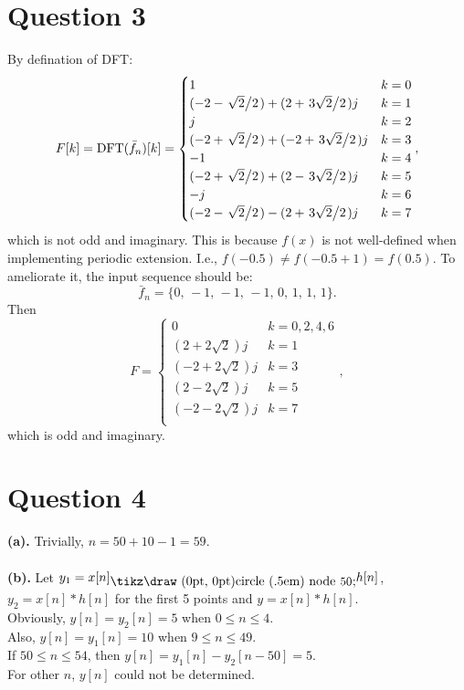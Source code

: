 \documentclass{article}
\newcommand*{\circled}[1]{\lower.7ex\hbox{\tikz\draw (0pt, 0pt)circle (.5em) node {\makebox[1em][c]{\small #1}};}}
\begin{document}
\section*{Question 3}
By defination of DFT:
\[
	F[k]=\mathrm{DFT}(\bar{f}_n)[k]=
	\begin{cases}
		1                                                         & k=0 \\
		(-2-\flatfrac{\sqrt{2}}{2})+(2+\flatfrac{3\sqrt{2}}{2})j  & k=1 \\
		j                                                         & k=2 \\
		(-2+\flatfrac{\sqrt{2}}{2})+(-2+\flatfrac{3\sqrt{2}}{2})j & k=3 \\
		-1                                                        & k=4 \\
		(-2+\flatfrac{\sqrt{2}}{2})+(2-\flatfrac{3\sqrt{2}}{2})j  & k=5 \\
		-j                                                        & k=6 \\
		(-2-\flatfrac{\sqrt{2}}{2})-(2+\flatfrac{3\sqrt{2}}{2})j  & k=7 \\
	\end{cases}
	,\] which is not odd and imaginary. This is because $f(x)$ is not well-defined when implementing periodic extension. I.e.,  $f(-0.5)\ne f(-0.5+1)=f(0.5)$. To ameliorate it, the input sequence should be:
\[
	\bar{f}_n=\{0,\,-1,\,-1,\,-1,\,0,\,1,\,1,\,1\}
	.\]
Then
\[
	F=
	\begin{cases}
		0               & k=0,2,4,6 \\
		(2+2\sqrt{2})j  & k=1       \\
		(-2+2\sqrt{2})j & k=3       \\
		(2-2\sqrt{2})j  & k=5       \\
		(-2-2\sqrt{2})j & k=7       \\
	\end{cases}
,\] which is odd and imaginary.

\section*{Question 4}
\textbf{(a).}
Trivially, $n=50+10-1=59$.
\\\\
\textbf{(b).}
Let $y_1=x[n]\circled{50}h[n]$, $y_2=x[n]*h[n]$ for the first 5 points and $y=x[n]*h[n]$.
\\
Obviously, $y[n]=y_2[n]=5$ when $0\le n\le 4$.
\\
Also, $y[n]=y_1[n]=10$ when $9\le n\le 49$.
\\
If $50\le n\le 54$, then $y[n]=y_1[n]-y_2[n-50]=5$.
\\
For other $n$, $y[n]$ could not be determined.
\end{document}
